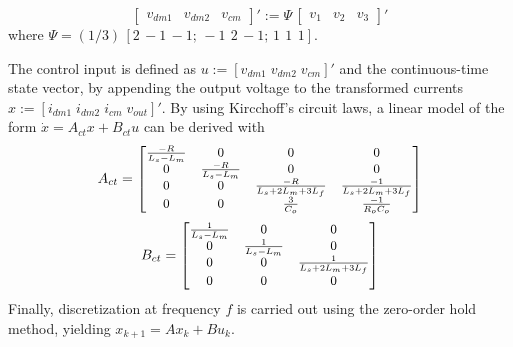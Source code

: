 \begin{equation}
	\begin{bmatrix}v_{dm1} & v_{dm2} & v_{cm}\end{bmatrix}' := \Psi \, \begin{bmatrix}v_{1} & v_{2} & v_{3}\end{bmatrix}' 
\end{equation}
where $\Psi = (1/3) \, [2 \, -1 \, -1; \, -1 \ \, 2 \, -1; \, 1 \ \, 1 \ \, 1]$.

The control input is defined as $u := [v_{dm1} \; v_{dm2} \; v_{cm}]'$ and the continuous-time state vector, by appending the output voltage to the transformed currents $x := [i_{dm1} \; i_{dm2} \; i_{cm} \; v_{out}]'$. By using Kircchoff's circuit laws, a linear model of the form $\dot{x} = A_{ct} x + B_{ct} u$ can be derived with
\begin{equation}
	\small
	A_{ct} = 
	\begin{bmatrix}
		\frac{-R}{L_s - L_m} & 0 & 0 & 0 \\
		0 & \frac{-R}{L_s - L_m} & 0 & 0 \\
		0 & 0 & \frac{-R}{L_s + 2L_m + 3L_f} & \frac{-1}{L_s + 2L_m + 3L_f} \\ 
		0 & 0 & \frac{3}{C_o} & \frac{-1}{R_o C_o}
	\end{bmatrix}
\end{equation}
\begin{equation}
	\small
	B_{ct} = 
	\begin{bmatrix}
		\frac{1}{L_s-L_m} & 0 & 0\\
		0 & \frac{1}{L_s-L_m} & 0 \\
		0 & 0 & \frac{1}{L_s + 2L_m + 3L_f} \\ 
		0 & 0 & 0
	\end{bmatrix}
\end{equation}
Finally, discretization at frequency $f$ is carried out using the zero-order hold method, yielding $x_{k+1} = A x_{k} + B u_{k}$.

